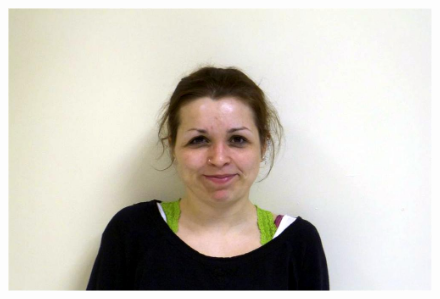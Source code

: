 \documentclass[11pt]{article}
\begin{document}
\begin{figure}[H]
\begin{center}
\includegraphics[scale=0.17]{figs/caricatures/fun_15.jpg} 


 \end{center}
\end{figure}
\end{document}
